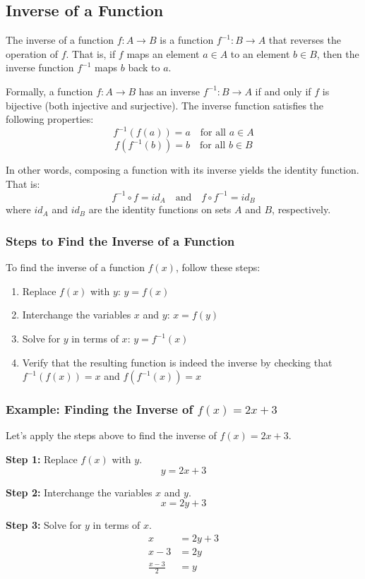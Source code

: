 \subsection{Inverse of a Function}
The inverse of a function $f: A \rightarrow B$ is a function $f^{-1}: B \rightarrow A$ that reverses the operation of $f$. That is, if $f$ maps an element $a \in A$ to an element $b \in B$, then the inverse function $f^{-1}$ maps $b$ back to $a$.

\noindent Formally, a function $f: A \rightarrow B$ has an inverse $f^{-1}: B \rightarrow A$ if and only if $f$ is bijective (both injective and surjective). The inverse function satisfies the following properties:
\[
f^{-1}(f(a)) = a \quad \text{for all } a \in A
\]
\[
f(f^{-1}(b)) = b \quad \text{for all } b \in B
\]

In other words, composing a function with its inverse yields the identity function. That is:
\[
f^{-1} \circ f = id_A \quad \text{and} \quad f \circ f^{-1} = id_B
\]
where $id_A$ and $id_B$ are the identity functions on sets $A$ and $B$, respectively.

\subsubsection{Steps to Find the Inverse of a Function}
To find the inverse of a function $f(x)$, follow these steps:
\begin{enumerate}
    \item Replace $f(x)$ with $y$: $y = f(x)$
    \item Interchange the variables $x$ and $y$: $x = f(y)$
    \item Solve for $y$ in terms of $x$: $y = f^{-1}(x)$
    \item Verify that the resulting function is indeed the inverse by checking that $f^{-1}(f(x)) = x$ and $f(f^{-1}(x)) = x$
\end{enumerate}

\subsubsection{Example: Finding the Inverse of $f(x) = 2x + 3$}
Let's apply the steps above to find the inverse of $f(x) = 2x + 3$.

\textbf{Step 1:} Replace $f(x)$ with $y$.
\[
y = 2x + 3
\]

\textbf{Step 2:} Interchange the variables $x$ and $y$.
\[
x = 2y + 3
\]

\textbf{Step 3:} Solve for $y$ in terms of $x$.
\begin{align}
x &= 2y + 3\\
x - 3 &= 2y\\
\frac{x - 3}{2} &= y
\end{align}

